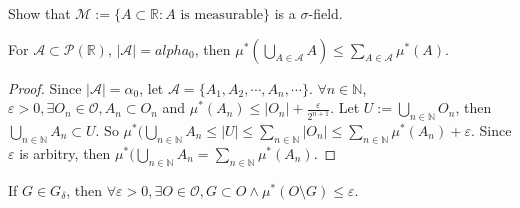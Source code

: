 \documentclass{ctexart}
\begin{document}
\begin{problem}
  Show that \(\mathcal{M}:=\{A \subset \mathbb{R}:A \text{ is measurable}\}\) is a \(\sigma\)-field. 
\end{problem}

\begin{lemma}\label{lem:0}
  For \(\mathcal{A} \subset \mathcal{P}(\mathbb{R})\), \(|\mathcal{A}| = alpha_0\),
  then \(\mu^{*}(\bigcup_{A \in \mathcal{A}} A) \leq \sum_{A \in \mathcal{A}} \mu^{*}(A)\). 
\end{lemma}

\begin{proof}
  Since \(|\mathcal{A}| = \alpha_0\), let \(\mathcal{A}=\{A_1 , A_2 , \cdots , A_n , \cdots\}\).
\(\forall n \in \mathbb{N}\), \(\varepsilon>0,\exists O_n \in \mathcal{O}, A_n\subset O_n \)
  and \(\mu^{*} (A_n) \leq |O_n|+\frac{\varepsilon}{2^{n+1}}\). 
  Let \(U:= \bigcup_{ n \in \mathbb{N}} O_n\), then \(\bigcup_{ n \in \mathbb{N}} A_n\subset U\). 
  So \(\mu^{*}(\bigcup_{n \in \mathbb{N}} A_n \leq |U| \leq \sum_{n \in \mathbb{N}} |O_n| \leq \sum_{ n \in \mathbb{N}} \mu ^{*}(A_n)+\varepsilon\). 
  Since \(\varepsilon\) is arbitry, then \(\mu^*(\bigcup_{n \in \mathbb{N}} A_n = \sum_{n \in \mathbb{N}} \mu^* (A_n) \). 
\end{proof}
\begin{lemma}\label{lem:1}
  If \(G \in G_{\delta}\), then \(\forall \varepsilon >0,\exists O \in \mathcal{O},G \subset O \wedge \mu^{*}(O\setminus G)\leq \varepsilon\). 
\end{lemma}
\end{document}
